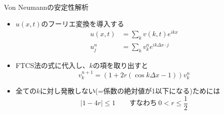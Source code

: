 \begin{frame}[t]{Von Neumannの安定性解析}
  \begin{itemize}
  \item $u(x,t)$のフーリエ変換を導入する
    \begin{align*}
    u(x,t) &= \sum_k v(k,t) e^{ikx} \\
    u_j^n &= \sum_k v_k^n e^{ik\Delta x \cdot j}
    \end{align*}
  \item FTCS法の式に代入し、$k$の項を取り出すと
    \[
    v_{k}^{n+1} =  (1 + 2r(\cos k \Delta x - 1)) v_{k}^{n}
    \]
  \item 全ての$k$に対し発散しない(=係数の絶対値が1以下になる)ためには
    \[
      | 1 - 4r | \le 1 \qquad \text{すなわち} \ 0 < r \le \frac{1}{2}
    \]
  \end{itemize}
\end{frame}
